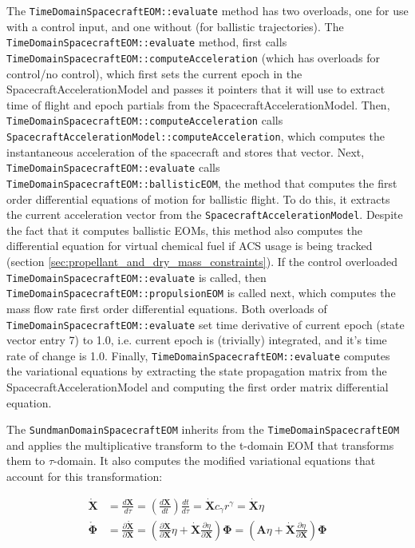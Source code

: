 The \texttt{TimeDomainSpacecraftEOM::evaluate} method has two overloads, one for use with a control input, and one without (for ballistic trajectories). The \texttt{TimeDomainSpacecraftEOM::evaluate} method, first calls \texttt{TimeDomainSpacecraftEOM::computeAcceleration} (which has overloads for control/no control), which first sets the current epoch in the SpacecraftAccelerationModel and passes it pointers that it will use to extract time of flight and epoch partials from the SpacecraftAccelerationModel. Then, \texttt{TimeDomainSpacecraftEOM::computeAcceleration} calls \texttt{SpacecraftAccelerationModel::computeAcceleration}, which computes the instantaneous acceleration of the spacecraft and stores that vector. Next, \texttt{TimeDomainSpacecraftEOM::evaluate} calls \texttt{TimeDomainSpacecraftEOM::ballisticEOM}, the method that computes the first order differential equations of motion for ballistic flight. To do this, it extracts the current acceleration vector from the \texttt{SpacecraftAccelerationModel}. Despite the fact that it computes ballistic EOMs, this method also computes the differential equation for virtual chemical fuel if ACS usage is being tracked (section \ref{sec:propellant_and_dry_mass_constraints}). If the control overloaded \texttt{TimeDomainSpacecraftEOM::evaluate} is called, then \texttt{TimeDomainSpacecraftEOM::propulsionEOM} is called next, which computes the mass flow rate first order differential equations. Both overloads of \texttt{TimeDomainSpacecraftEOM::evaluate} set time derivative of current epoch (state vector entry 7) to 1.0, i.e. current epoch is (trivially) integrated, and it's time rate of change is 1.0. Finally, \texttt{TimeDomainSpacecraftEOM::evaluate} computes the variational equations by extracting the state propagation matrix from the SpacecraftAccelerationModel and computing the first order matrix differential equation.

The \texttt{SundmanDomainSpacecraftEOM} inherits from the \texttt{TimeDomainSpacecraftEOM} and applies the multiplicative transform to the t-domain EOM that transforms them to $\tau$-domain. It also computes the modified variational equations that account for this transformation:

\begin{align}
\mathring{\mathbf{X}} &= \frac{d\mathbf{X}}{d\tau} = \left( \frac{d\mathbf{X}}{dt} \right) \frac{dt}{d\tau} = \dot{\mathbf{X}}c_{\gamma} r^{\gamma} = \dot{\mathbf{X}}\eta\\
\mathring{\mathbf{\Phi}} &= \frac{\partial \mathring{\mathbf{X}}}{\partial \mathbf{X}} = \left( \frac{\partial \dot{\mathbf{X}}}{\partial \mathbf{X}}\eta + \dot{\mathbf{X}}\frac{\partial \eta}{\partial \mathbf{X}} \right) \mathbf{\Phi} = \left( \mathbf{A}\eta + \dot{\mathbf{X}}\frac{\partial \eta}{\partial \mathbf{X}} \right) \mathbf{\Phi}
\end{align}

